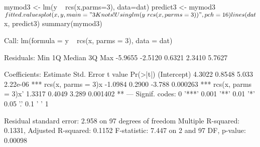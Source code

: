 \begin{Schunk}
\begin{Sinput}
 mymod3 <- lm(y ~ rcs(x,parms=3), data=dat)
 predict3 <- mymod3$fitted.values
 plot(x,y,main="3 Knots! Using lm(y~rcs(x,parms=3))", pch=16)
 lines(dat$x, predict3)
 summary(mymod3)
\end{Sinput}
\begin{Soutput}
Call:
lm(formula = y ~ rcs(x, parms = 3), data = dat)

Residuals:
    Min      1Q  Median      3Q     Max 
-5.9655 -2.5120  0.6321  2.3410  5.7627 

Coefficients:
                    Estimate Std. Error t value Pr(>|t|)    
(Intercept)           4.3022     0.8548   5.033 2.22e-06 ***
rcs(x, parms = 3)x   -1.0984     0.2900  -3.788 0.000263 ***
rcs(x, parms = 3)x'   1.3317     0.4049   3.289 0.001402 ** 
---
Signif. codes:  0 '***' 0.001 '**' 0.01 '*' 0.05 '.' 0.1 ' ' 1

Residual standard error: 2.958 on 97 degrees of freedom
Multiple R-squared:  0.1331,	Adjusted R-squared:  0.1152 
F-statistic: 7.447 on 2 and 97 DF,  p-value: 0.00098
\end{Soutput}
\end{Schunk}

